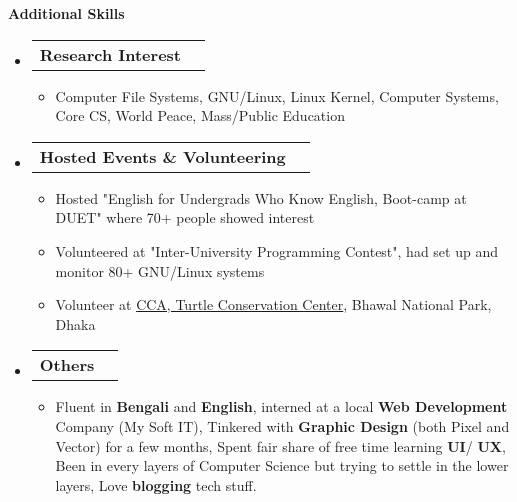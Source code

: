 \documentclass[letterpaper,10pt]{article}
\makeatletter
\newcommand{\resheading}[1]{{\large \colorbox{mygrey}{\begin{minipage}{\textwidth}{\textbf{#1 \vphantom{p\^{E}}}}\end{minipage}}}}
\newcommand{\ressubheading}[4]{
	\begin{tabular*}{7.1in}{l@{\extracolsep{\fill}}r}
		\textbf{#1} & \textit{#4} \\
	\end{tabular*}\vspace{-6pt}}
\makeatother
\begin{document}
	\resheading{Additional Skills}
	\begin{itemize}
		\item \ressubheading{Research Interest}{}{}{}
		\begin{itemize}
			\item Computer File Systems, GNU/Linux, Linux Kernel, Computer Systems, Core CS,  World Peace, Mass/Public Education
		\end{itemize}
		
		\item \ressubheading{Hosted Events \& Volunteering}{}{}{}
		\begin{itemize}
			\item Hosted "English for Undergrads Who Know English, Boot-camp at DUET" where 70+ people showed interest
			
			\item Volunteered at "Inter-University Programming Contest", had set up and monitor 80+ GNU/Linux systems
			
			\item Volunteer at \href{https://www.instagram.com/creativeconservationalliance/}{CCA, Turtle Conservation Center}, Bhawal National Park, Dhaka 
		\end{itemize}

	
		\item \ressubheading{Others}{}{}{}
		\begin{itemize}
			\item Fluent in \textbf{Bengali} and \textbf{English}, interned at a local \textbf{Web Development} Company (My Soft IT), Tinkered with \textbf{Graphic Design} (both Pixel and Vector) for a few months, Spent fair share of free time learning \textbf{UI}/ \textbf{UX}, Been in every layers of Computer Science but trying to settle in the lower layers, Love \textbf{blogging} tech stuff.
		\end{itemize}


	\end{itemize}
\vfill
\end{document}
